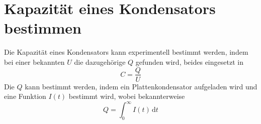 \documentclass{article}
\begin{document}
\section{Kapazität eines Kondensators bestimmen}
Die Kapazität eines Kondensators kann experimentell bestimmt werden, indem bei einer bekannten $U$ die dazugehörige $Q$ gefunden wird, beides eingesetzt in
\[
 C = \frac{Q}{U} 
\] 
Die $Q$ kann bestimmt werden, indem ein Plattenkondensator aufgeladen wird und eine Funktion $I(t)$ bestimmt wird, wobei bekannterweise
\[
 Q = \int_0^\infty I(t) \, \text{d}t
\] 
\end{document}
